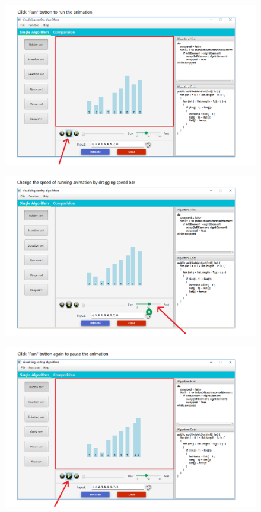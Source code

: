 \documentclass[paper=a4, fontsize=11pt,twoside]{scrartcl}		%
\begin{document}
\begin{figure}[htbp]
\centering
\includegraphics[width=1\textwidth]{user_menu/5.png}
\label{user_menu5}
\end{figure}

\begin{figure}[htbp]
\centering
\includegraphics[width=1\textwidth]{user_menu/6.png}
\label{user_menu6}
\end{figure}

\begin{figure}[htbp]
\centering
\includegraphics[width=1\textwidth]{user_menu/7.png}
\label{user_menu7}
\end{figure}
\end{document}
